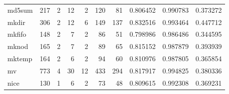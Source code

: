 \begin{longtable}{lrrrrrrrrr}
md5sum    &                    217 &                                  2 &                                12 &                                2 &                               120 &                              81 &                                0.806452 &                               0.990783 &                             0.373272 \\
mkdir     &                    306 &                                  2 &                                12 &                                6 &                               149 &                             137 &                                0.832516 &                               0.993464 &                             0.447712 \\
mkfifo    &                    148 &                                  2 &                                 7 &                                2 &                                86 &                              51 &                                0.798986 &                               0.986486 &                             0.344595 \\
mknod     &                    165 &                                  2 &                                 7 &                                2 &                                89 &                              65 &                                0.815152 &                               0.987879 &                             0.393939 \\
mktemp    &                    164 &                                  2 &                                 6 &                                2 &                                94 &                              60 &                                0.810976 &                               0.987805 &                             0.365854 \\
mv        &                    773 &                                  4 &                                30 &                               12 &                               433 &                             294 &                                0.817917 &                               0.994825 &                             0.380336 \\
nice      &                    130 &                                  1 &                                 6 &                                2 &                                73 &                              48 &                                0.809615 &                               0.992308 &                             0.369231 \\

\end{longtable}
